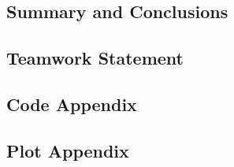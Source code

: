 \documentclass[letter,11pt]{article}
\begin{document}
\subsection*{Summary and Conclusions}

\begin{thebibliography}{99}
\end{thebibliography}

\subsection*{Teamwork Statement}

\subsection*{Code Appendix}

\subsection*{Plot Appendix}
\end{document}
